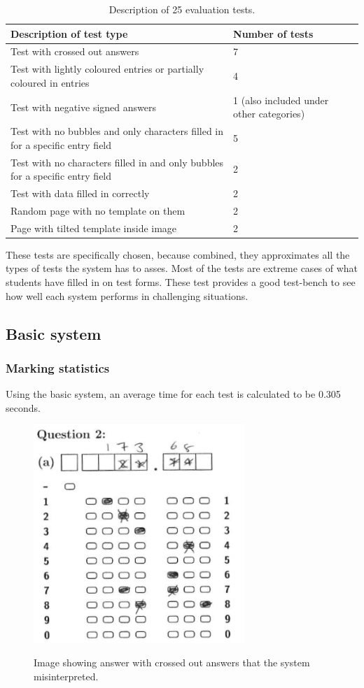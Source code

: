 \begin{table}
\caption{Description of 25 evaluation tests.} \label{tbl:25Tests}
  \centering
\begin{tabular}{|p{6cm}|p{4cm}|}
\hline
\textbf{Description of test type}&\textbf{Number of tests}\\
\hline
Test with crossed out answers&7\\
\hline
Test with lightly coloured entries or partially coloured in entries&4\\
\hline
Test with negative signed answers&1 (also included under other categories)\\
\hline
Test with no bubbles and only characters filled in for a specific entry field &5\\
\hline
Test with no characters filled in and only bubbles for a specific entry field&2\\
\hline
Test with data filled in correctly&2\\
\hline
Random page with no template on them&2\\
\hline
Page with tilted template inside image&2\\
\hline
\end{tabular} 
\end{table}

These tests are specifically chosen, because combined, they approximates all the types of tests the system has to asses. Most of the tests are extreme cases of what students have filled in on test forms. These test provides a good test-bench to see how well each system performs in challenging situations.

\subsection{Basic system}
\subsubsection{Marking statistics}

Using the basic system, an average time for each test is calculated to be 0.305 seconds. 

\begin{figure}
  \centering
  \includegraphics[width=8cm]{crossClash}\\
  \caption{Image showing answer with crossed out answers that the system misinterpreted.}
  \label{fig:crossClash}
\end{figure}

